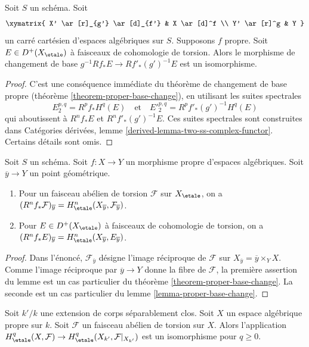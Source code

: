 \begin{lemma}
\label{lemma-proper-base-change}
Soit $S$ un schéma. Soit
$$
\xymatrix{
X' \ar[r]_{g'} \ar[d]_{f'} & X \ar[d]^f \\
Y' \ar[r]^g & Y
}
$$
un carré cartésien d'espaces algébriques sur $S$. Supposons $f$ propre.
Soit $E \in D^+(X_\etale)$ à faisceaux de cohomologie de torsion.
Alors le morphisme de changement de base $g^{-1}Rf_*E \to Rf'_*(g')^{-1}E$
est un isomorphisme.
\end{lemma}

\begin{proof}
C'est une conséquence immédiate du théorème de changement de base propre
(théorème \ref{theorem-proper-base-change}), en utilisant les suites
spectrales
$$
E_2^{p, q} = R^pf_*H^q(E)
\quad\text{et}\quad
{E'}_2^{p, q} = R^pf'_*(g')^{-1}H^q(E)
$$
qui aboutissent à $R^nf_*E$ et $R^nf'_*(g')^{-1}E$.
Ces suites spectrales sont construites dans Catégories dérivées, lemme
\ref{derived-lemma-two-ss-complex-functor}.
Certains détails sont omis.
\end{proof}

\begin{lemma}
\label{lemma-proper-base-change-stalk}
Soit $S$ un schéma.
Soit $f : X \to Y$ un morphisme propre d'espaces algébriques.
Soit $\overline{y} \to Y$ un point géométrique.
\begin{enumerate}
\item Pour un faisceau abélien de torsion $\mathcal{F}$ sur $X_\etale$, on a
$(R^nf_*\mathcal{F})_{\overline{y}} =
H^n_\etale(X_{\overline{y}}, \mathcal{F}_{\overline{y}})$.
\item Pour $E \in D^+(X_\etale)$ à faisceaux de cohomologie de torsion, on a
$(R^nf_*E)_{\overline{y}} = H^n_\etale(X_{\overline{y}}, E_{\overline{y}})$.
\end{enumerate}
\end{lemma}

\begin{proof}
Dans l'énoncé, $\mathcal{F}_{\overline{y}}$ désigne l'image réciproque
de $\mathcal{F}$ sur $X_{\overline{y}} = \overline{y} \times_Y X$.
Comme l'image réciproque par $\overline{y} \to Y$ donne la fibre de
$\mathcal{F}$, la première assertion du lemme est un cas particulier du
théorème \ref{theorem-proper-base-change}. La seconde est un cas particulier
du lemme \ref{lemma-proper-base-change}.
\end{proof}

\begin{lemma}
\label{lemma-base-change-separably-closed}
Soit $k'/k$ une extension de corps séparablement clos.
Soit $X$ un espace algébrique propre sur $k$.
Soit $\mathcal{F}$ un faisceau abélien de torsion sur $X$.
Alors l'application $H^q_\etale(X, \mathcal{F}) \to
H^q_\etale(X_{k'}, \mathcal{F}|_{X_{k'}})$ est un isomorphisme
pour $q \geq 0$.
\end{lemma}

